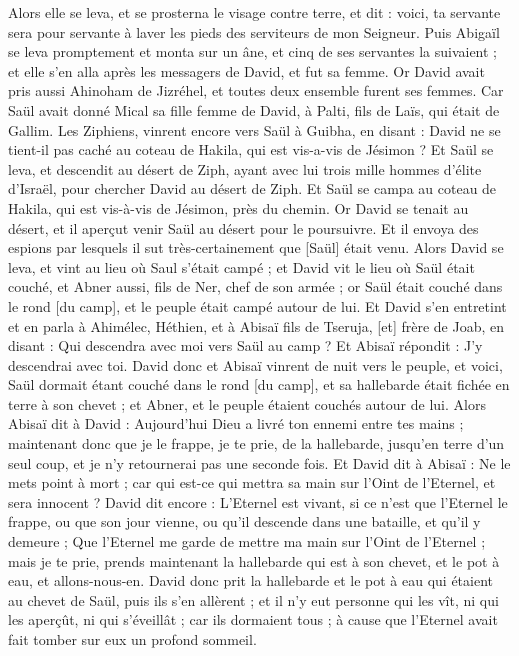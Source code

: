 \begin{multicols}{2}
Alors elle se leva, et se prosterna le visage contre terre, et dit : voici, ta servante sera pour servante à laver les pieds des serviteurs de mon Seigneur.
Puis Abigaïl se leva promptement et monta sur un âne, et cinq de ses servantes la suivaient ; et elle s'en alla après les messagers de David, et fut sa femme.
Or David avait pris aussi Ahinoham de Jizréhel, et toutes deux ensemble furent ses femmes.
Car Saül avait donné Mical sa fille femme de David, à Palti, fils de Laïs, qui était de Gallim.
\VerseOne{}Les Ziphiens, vinrent encore vers Saül à Guibha, en disant : David ne se tient-il pas caché au coteau de Hakila, qui est vis-a-vis de Jésimon ?
Et Saül se leva, et descendit au désert de Ziph, ayant avec lui trois mille hommes d'élite d'Israël, pour chercher David au désert de Ziph.
Et Saül se campa au coteau de Hakila, qui est vis-à-vis de Jésimon, près du chemin. Or David se tenait au désert, et il aperçut venir Saül au désert pour le poursuivre.
Et il envoya des espions par lesquels il sut très-certainement que [Saül] était venu.
Alors David se leva, et vint au lieu où Saul s'était campé ; et David vit le lieu où Saül était couché, et Abner aussi, fils de Ner, chef de son armée ; or Saül était couché dans le rond [du camp], et le peuple était campé autour de lui.
Et David s'en entretint et en parla à Ahimélec, Héthien, et à Abisaï fils de Tseruja, [et] frère de Joab, en disant : Qui descendra avec moi vers Saül au camp ? Et Abisaï répondit : J'y descendrai avec toi.
David donc et Abisaï vinrent de nuit vers le peuple, et voici, Saül dormait étant couché dans le rond [du camp], et sa hallebarde était fichée en terre à son chevet ; et Abner, et le peuple étaient couchés autour de lui.
Alors Abisaï dit à David : Aujourd'hui Dieu a livré ton ennemi entre tes mains ; maintenant donc que je le frappe, je te prie, de la hallebarde, jusqu'en terre d'un seul coup, et je n'y retournerai pas une seconde fois.
Et David dit à Abisaï : Ne le mets point à mort ; car qui est-ce qui mettra sa main sur l'Oint de l'Eternel, et sera innocent ?
David dit encore : L'Eternel est vivant, si ce n'est que l'Eternel le frappe, ou que son jour vienne, ou qu'il descende dans une bataille, et qu'il y demeure ;
Que l'Eternel me garde de mettre ma main sur l'Oint de l'Eternel ; mais je te prie, prends maintenant la hallebarde qui est à son chevet, et le pot à eau, et allons-nous-en.
David donc prit la hallebarde et le pot à eau qui étaient au chevet de Saül, puis ils s'en allèrent ; et il n'y eut personne qui les vît, ni qui les aperçût, ni qui s'éveillât ; car ils dormaient tous ; à cause que l'Eternel avait fait tomber sur eux un profond sommeil.

\end{multicols}
